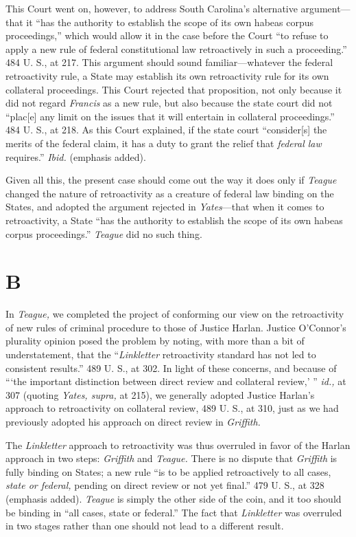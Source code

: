   This Court went on, however, to address South Carolina's alternative argument---that it ``has the authority to establish the scope of its own habeas corpus proceedings,'' which would allow it in the case before the Court ``to refuse to apply a new rule of federal constitutional law retroactively in such a proceeding.'' 484 U. S., at 217. This argument should sound familiar---whatever the federal retroactivity rule, a State may establish its own retroactivity rule for its own collateral proceedings. This Court rejected that proposition, not only because it did not regard \emph{Francis} as a new rule, but also because the state court did not ``plac[e] any limit on the issues that it will entertain in collateral proceed\newpage ings.'' 484 U. S., at 218. As this Court explained, if the state court ``consider[s] the merits of the federal claim, it has a duty to grant the relief that \emph{federal law} requires.'' \emph{Ibid.} (emphasis added).

  Given all this, the present case should come out the way it does only if \emph{Teague} changed the nature of retroactivity as a creature of federal law binding on the States, and adopted the argument rejected in \emph{Yates}---that when it comes to retroactivity, a State ``has the authority to establish the scope of its own habeas corpus proceedings.'' \emph{Teague} did no such thing.

\section{B}

  In \emph{Teague,} we completed the project of conforming our view on the retroactivity of new rules of criminal procedure to those of Justice Harlan. Justice O'Connor's plurality opinion posed the problem by noting, with more than a bit of understatement, that the ``\emph{Linkletter} retroactivity standard has not led to consistent results.'' 489 U. S., at 302. In light of these concerns, and because of ``‘the important distinction between direct review and collateral review,' '' \emph{id.,} at 307 (quoting \emph{Yates, supra,} at 215), we generally adopted Justice Harlan's approach to retroactivity on collateral review, 489 U. S., at 310, just as we had previously adopted his approach on direct review in \emph{Griffith.}

  The \emph{Linkletter} approach to retroactivity was thus overruled in favor of the Harlan approach in two steps: \emph{Griffith} and \emph{Teague.} There is no dispute that \emph{Griffith} is fully binding on States; a new rule ``is to be applied retroactively to all cases, \emph{state or federal,} pending on direct review or not yet final.'' 479 U. S., at 328 (emphasis added). \emph{Teague} is simply the other side of the coin, and it too should be binding in ``all cases, state or federal.'' The fact that \emph{Linkletter} was overruled in two stages rather than one should not lead to a different result.

